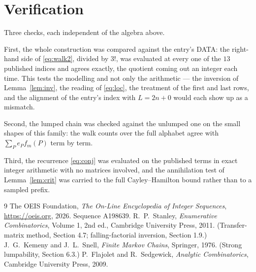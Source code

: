 \documentclass[11pt,a4paper]{article}
\theoremstyle{plain}
\theoremstyle{definition}
\begin{document}
\section{Verification}

Three checks, each independent of the algebra above.

First, the whole construction was compared against the entry's DATA: the right-hand side of
\eqref{eq:walk2}, divided by $3!$, was evaluated at every one of the $13$
published indices and agrees exactly, the quotient coming out an integer each time. This
tests the modelling and not only the arithmetic --- the inversion of Lemma~\ref{lem:inv},
the reading of \eqref{eq:loc}, the treatment of the first and last rows, and the
alignment of the entry's index with $L=2n+0$ would each show up as a mismatch.

Second, the lumped chain was checked against the unlumped one on the small shapes of this
family: the walk counts over the full alphabet agree with $\sum_P e_Pf_m(P)$ term by term.

Third, the recurrence \eqref{eq:conj} was evaluated on the published terms in exact integer
arithmetic with no matrices involved, and the annihilation test of Lemma~\ref{lem:crit} was
carried to the full Cayley--Hamilton bound rather than to a sampled prefix.

\begin{thebibliography}{9}
 The OEIS Foundation, \emph{The On-Line Encyclopedia of Integer
Sequences}, \url{https://oeis.org}, 2026. Sequence A198639.
 R.~P.~Stanley, \emph{Enumerative Combinatorics}, Volume 1, 2nd ed.,
Cambridge University Press, 2011. (Transfer-matrix method, Section 4.7; falling-factorial
inversion, Section 1.9.)
 J.~G.~Kemeny and J.~L.~Snell, \emph{Finite Markov Chains}, Springer,
1976. (Strong lumpability, Section 6.3.)
 P.~Flajolet and R.~Sedgewick, \emph{Analytic Combinatorics}, Cambridge
University Press, 2009.
\end{thebibliography}
\end{document}

